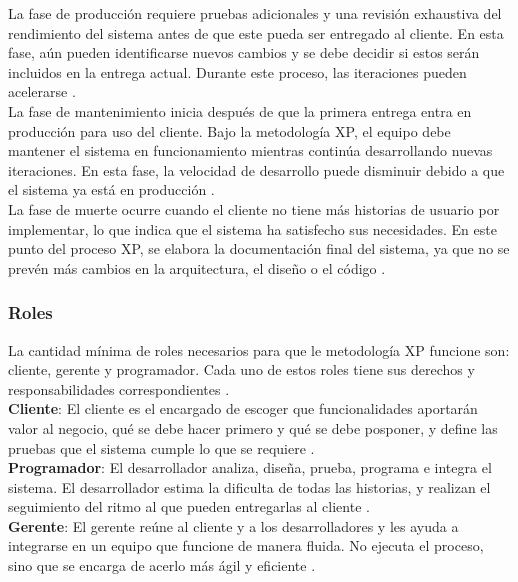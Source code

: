 La fase de producción requiere pruebas adicionales y una revisión exhaustiva del
rendimiento del sistema antes de que este pueda ser  entregado  al  cliente.  En
esta fase, aún pueden identificarse nuevos cambios y se debe  decidir  si  estos
serán incluidos en la entrega actual.  Durante  este  proceso,  las  iteraciones
pueden acelerarse \parencite{abrahamsson2017agile}. \\

La fase de mantenimiento inicia después de  que  la  primera  entrega  entra  en
producción para uso del cliente. Bajo la metodología XP, el equipo debe mantener
el sistema en funcionamiento mientras continúa desarrollando nuevas iteraciones.
En esta fase, la velocidad de desarrollo puede disminuir debido a que el sistema
ya está en producción \parencite{abrahamsson2017agile}. \\

La fase de muerte ocurre cuando el cliente no tiene más historias de usuario por
implementar, lo que indica que el sistema ha satisfecho sus necesidades. En este
punto del proceso XP, se elabora la documentación final del sistema, ya  que  no
se  prevén  más  cambios  en  la   arquitectura,   el   diseño   o   el   código
\parencite{abrahamsson2017agile}.

\subsubsection{Roles}

La cantidad mínima de roles necesarios para que le metodología XP funcione  son:
cliente, gerente y programador. Cada uno de estos roles  tiene  sus  derechos  y
responsabilidades correspondientes \parencite{jeffries2000xpinstalled}.\\

\textbf{Cliente}: El cliente es el  encargado  de  escoger  que  funcionalidades
aportarán valor al negocio, qué se debe hacer primero y qué se debe posponer,  y
define   las   pruebas   que   el   sistema   cumple   lo   que   se    requiere
\parencite{jeffries2000xpinstalled}.\\

\textbf{Programador}: El  desarrollador  analiza,  diseña,  prueba,  programa  e
integra el sistema. El desarrollador estima la dificulta de todas las historias,
y realizan el seguimiento  del  ritmo  al  que  pueden  entregarlas  al  cliente
\parencite{jeffries2000xpinstalled}.\\

\textbf{Gerente}: El gerente reúne al cliente y  a  los  desarrolladores  y  les
ayuda a integrarse en un equipo que funcione de manera  fluida.  No  ejecuta  el
proceso,   sino   que   se   encarga   de   acerlo   más   ágil   y    eficiente
\parencite{jeffries2000xpinstalled}.\\

